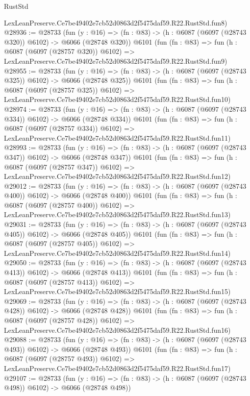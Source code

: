 \begin{lexlean}{RustStd}
\begin{coremodule}
    LexLeanPreserve.Ce7be49402e7cb52d0863d2f5475daf59.R22.RustStd.fun8)
@28936 := @28733
    (fun (y : @16) => (fn : @83) -> (h : @6087 (@6097 (@28743 @320)) @6102) -> @6066 (@28748 @320))
    @6101
    (fun (fn : @83) =>
    fun (h : @6087 (@6097 (@28757 @320)) @6102) =>
    LexLeanPreserve.Ce7be49402e7cb52d0863d2f5475daf59.R22.RustStd.fun9)
@28955 := @28733
    (fun (y : @16) => (fn : @83) -> (h : @6087 (@6097 (@28743 @325)) @6102) -> @6066 (@28748 @325))
    @6101
    (fun (fn : @83) =>
    fun (h : @6087 (@6097 (@28757 @325)) @6102) =>
    LexLeanPreserve.Ce7be49402e7cb52d0863d2f5475daf59.R22.RustStd.fun10)
@28974 := @28733
    (fun (y : @16) => (fn : @83) -> (h : @6087 (@6097 (@28743 @334)) @6102) -> @6066 (@28748 @334))
    @6101
    (fun (fn : @83) =>
    fun (h : @6087 (@6097 (@28757 @334)) @6102) =>
    LexLeanPreserve.Ce7be49402e7cb52d0863d2f5475daf59.R22.RustStd.fun11)
@28993 := @28733
    (fun (y : @16) => (fn : @83) -> (h : @6087 (@6097 (@28743 @347)) @6102) -> @6066 (@28748 @347))
    @6101
    (fun (fn : @83) =>
    fun (h : @6087 (@6097 (@28757 @347)) @6102) =>
    LexLeanPreserve.Ce7be49402e7cb52d0863d2f5475daf59.R22.RustStd.fun12)
@29012 := @28733
    (fun (y : @16) => (fn : @83) -> (h : @6087 (@6097 (@28743 @400)) @6102) -> @6066 (@28748 @400))
    @6101
    (fun (fn : @83) =>
    fun (h : @6087 (@6097 (@28757 @400)) @6102) =>
    LexLeanPreserve.Ce7be49402e7cb52d0863d2f5475daf59.R22.RustStd.fun13)
@29031 := @28733
    (fun (y : @16) => (fn : @83) -> (h : @6087 (@6097 (@28743 @405)) @6102) -> @6066 (@28748 @405))
    @6101
    (fun (fn : @83) =>
    fun (h : @6087 (@6097 (@28757 @405)) @6102) =>
    LexLeanPreserve.Ce7be49402e7cb52d0863d2f5475daf59.R22.RustStd.fun14)
@29050 := @28733
    (fun (y : @16) => (fn : @83) -> (h : @6087 (@6097 (@28743 @413)) @6102) -> @6066 (@28748 @413))
    @6101
    (fun (fn : @83) =>
    fun (h : @6087 (@6097 (@28757 @413)) @6102) =>
    LexLeanPreserve.Ce7be49402e7cb52d0863d2f5475daf59.R22.RustStd.fun15)
@29069 := @28733
    (fun (y : @16) => (fn : @83) -> (h : @6087 (@6097 (@28743 @428)) @6102) -> @6066 (@28748 @428))
    @6101
    (fun (fn : @83) =>
    fun (h : @6087 (@6097 (@28757 @428)) @6102) =>
    LexLeanPreserve.Ce7be49402e7cb52d0863d2f5475daf59.R22.RustStd.fun16)
@29088 := @28733
    (fun (y : @16) => (fn : @83) -> (h : @6087 (@6097 (@28743 @493)) @6102) -> @6066 (@28748 @493))
    @6101
    (fun (fn : @83) =>
    fun (h : @6087 (@6097 (@28757 @493)) @6102) =>
    LexLeanPreserve.Ce7be49402e7cb52d0863d2f5475daf59.R22.RustStd.fun17)
@29107 := @28733
    (fun (y : @16) => (fn : @83) -> (h : @6087 (@6097 (@28743 @498)) @6102) -> @6066 (@28748 @498))

\end{coremodule}
\end{lexlean}
